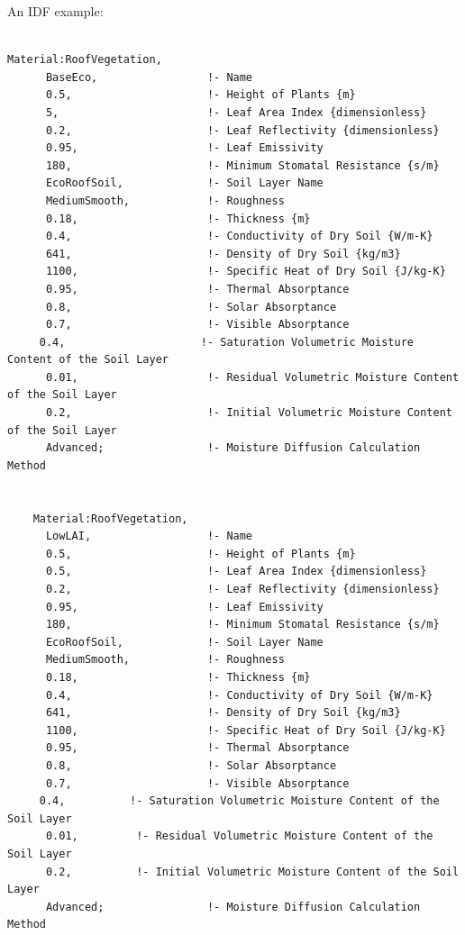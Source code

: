 An IDF example:

\begin{lstlisting}

Material:RoofVegetation,
      BaseEco,                 !- Name
      0.5,                     !- Height of Plants {m}
      5,                       !- Leaf Area Index {dimensionless}
      0.2,                     !- Leaf Reflectivity {dimensionless}
      0.95,                    !- Leaf Emissivity
      180,                     !- Minimum Stomatal Resistance {s/m}
      EcoRoofSoil,             !- Soil Layer Name
      MediumSmooth,            !- Roughness
      0.18,                    !- Thickness {m}
      0.4,                     !- Conductivity of Dry Soil {W/m-K}
      641,                     !- Density of Dry Soil {kg/m3}
      1100,                    !- Specific Heat of Dry Soil {J/kg-K}
      0.95,                    !- Thermal Absorptance
      0.8,                     !- Solar Absorptance
      0.7,                     !- Visible Absorptance
     0.4,                     !- Saturation Volumetric Moisture Content of the Soil Layer
      0.01,                    !- Residual Volumetric Moisture Content of the Soil Layer
      0.2,                     !- Initial Volumetric Moisture Content of the Soil Layer
      Advanced;                !- Moisture Diffusion Calculation Method


    Material:RoofVegetation,
      LowLAI,                  !- Name
      0.5,                     !- Height of Plants {m}
      0.5,                     !- Leaf Area Index {dimensionless}
      0.2,                     !- Leaf Reflectivity {dimensionless}
      0.95,                    !- Leaf Emissivity
      180,                     !- Minimum Stomatal Resistance {s/m}
      EcoRoofSoil,             !- Soil Layer Name
      MediumSmooth,            !- Roughness
      0.18,                    !- Thickness {m}
      0.4,                     !- Conductivity of Dry Soil {W/m-K}
      641,                     !- Density of Dry Soil {kg/m3}
      1100,                    !- Specific Heat of Dry Soil {J/kg-K}
      0.95,                    !- Thermal Absorptance
      0.8,                     !- Solar Absorptance
      0.7,                     !- Visible Absorptance
     0.4,          !- Saturation Volumetric Moisture Content of the Soil Layer
      0.01,         !- Residual Volumetric Moisture Content of the Soil Layer
      0.2,          !- Initial Volumetric Moisture Content of the Soil Layer
      Advanced;                !- Moisture Diffusion Calculation Method
\end{lstlisting}


